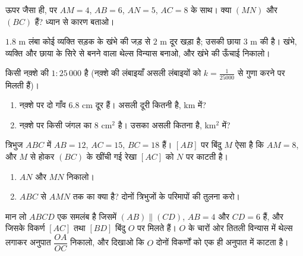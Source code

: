 \begin{exercise}[$\star\star$]\label{exo:g9:thales:5}
ऊपर जैसा ही, पर $AM = 4$, $AB = 6$, $AN = 5$, $AC = 8$ के साथ। क्या
$(MN)$ और $(BC)$  हैं? ध्यान से कारण बताओ।
\end{exercise}

\begin{exercise}[$\star\star$]\label{exo:g9:thales:6}
$1.8$ m लंबा कोई व्यक्ति सड़क के खंभे की जड़ से $2$ m दूर खड़ा है;
उसकी छाया $3$ m की है। खंभे, व्यक्ति और छाया के सिरे से बनने वाला
थेल्स विन्यास बनाओ, और खंभे की ऊँचाई निकालो।
\end{exercise}

\begin{exercise}[$\star\star$]\label{exo:g9:thales:7}
किसी नक़्शे की  $1 : 25\,000$ है (नक़्शे की लंबाइयाँ असली
लंबाइयों को $k = \frac{1}{25000}$ से गुणा करने पर मिलती हैं)।
\begin{enumerate}
  \item नक़्शे पर दो गाँव $6.8$ cm दूर हैं। असली दूरी कितनी है, km
        में?
  \item नक़्शे पर किसी जंगल का  $8$ cm$^2$ है। उसका असली
         कितना है, km$^2$ में?
\end{enumerate}
\end{exercise}

\begin{exercise}[$\star\star$]\label{exo:g9:thales:8}
त्रिभुज $ABC$ में $AB = 12$, $AC = 15$, $BC = 18$ हैं। $[AB]$ पर बिंदु
$M$ ऐसा है कि $AM = 8$, और $M$ से होकर $(BC)$ के  खींची गई रेखा
$[AC]$ को $N$ पर काटती है।
\begin{enumerate}
  \item $AN$ और $MN$ निकालो।
  \item $ABC$ से $AMN$ तक का  क्या है? दोनों त्रिभुजों के
        परिमापों की तुलना करो।
\end{enumerate}
\end{exercise}

\begin{exercise}[$\star\star\star$]\label{exo:g9:thales:9}
मान लो $ABCD$ एक समलंब है जिसमें $(AB) \parallel (CD)$, $AB = 4$ और
$CD = 6$ हैं, और जिसके विकर्ण $[AC]$ तथा $[BD]$ बिंदु $O$ पर मिलते
हैं। $O$ के चारों ओर तितली विन्यास में थेल्स लगाकर अनुपात
$\dfrac{OA}{OC}$ निकालो, और दिखाओ कि $O$ दोनों विकर्णों को एक ही
अनुपात में काटता है।
\end{exercise}


